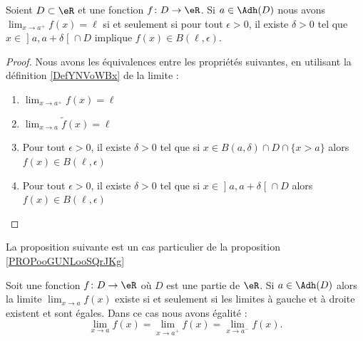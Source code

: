 \begin{lemma}       \label{LEMooXJMFooCkzoVi}
	Soient \( D\subset \eR\) et une fonction \( f\colon D\to \eR\). Si \( a\in \Adh(D)\) nous avons \( \lim_{x\to a^+} f(x)=\ell\) si et seulement si pour tout \( \epsilon>0\), il existe \( \delta>0\) tel que  \( x\in\mathopen] a , a+\delta \mathclose[\cap D\) implique \( f(x)\in B(\ell,\epsilon)\).
\end{lemma}

\begin{proof}
	Nous avons les équivalences entre les propriétés suivantes, en utilisant la définition \ref{DefYNVoWBx} de la limite :
	\begin{enumerate}
		\item
		      \( \lim_{x\to a^+} f(x)=\ell\)
		\item
		      \( \lim_{x\to a} \tilde f(x)=\ell\)
		\item
		      Pour tout \( \epsilon>0\), il existe \( \delta>0\) tel que si \( x\in B(a,\delta)\cap D\cap\{ x>a \}\) alors \( f(x)\in B(\ell,\epsilon)\)
		\item
		      Pour tout \( \epsilon>0\), il existe \( \delta>0\) tel que si \( x\in \mathopen] a , a+\delta \mathclose[\cap D\) alors \( f(x)\in B(\ell,\epsilon)\)
	\end{enumerate}
\end{proof}

La proposition suivante est un cas particulier de la proposition \ref{PROPooGUNLooSQrJKg}
\begin{proposition}      \label{PROPooGDDJooDCmydE}
	Soit une fonction \( f\colon D\to \eR\) où \( D\) est une partie de \( \eR\). Si \( a\in \Adh(D)\) alors la limite \( \lim_{x\to a} f(x)\) existe si et seulement si les limites à gauche et à droite existent et sont égales. Dans ce cas nous avons égalité :
	\begin{equation}
		\lim_{x\to a} f(x)=\lim_{x\to a^+} f(x)=\lim_{x\to a^-} f(x).
	\end{equation}
\end{proposition}


